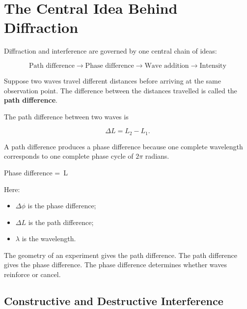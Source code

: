 \documentclass{studentnotes}
\begin{document}
\makenotetitle%

\tableofcontents
\newpage

\section{The Central Idea Behind Diffraction}

Diffraction and interference are governed by one central chain of ideas:

\[
    \boxed{
        \text{Path difference}
        \longrightarrow
        \text{Phase difference}
        \longrightarrow
        \text{Wave addition}
        \longrightarrow
        \text{Intensity}
    }
\]

Suppose two waves travel different distances before arriving at the same observation point. The difference between the distances travelled is called the \textbf{path difference}.

\begin{definition}
    The path difference between two waves is

    \[
        \Delta L=L_2-L_1.
    \]
\end{definition}

A path difference produces a phase difference because one complete wavelength corresponds to one complete phase cycle of \(2\pi\) radians.

\begin{namedformula}{Phase difference}
    \Delta\phi%
    =
    \frac{2\pi}{\lambda}\Delta\,L
\end{namedformula}

Here:

\begin{itemize}
    \item \(\Delta\phi\) is the phase difference;
    \item \(\Delta L\) is the path difference;
    \item \(\lambda\) is the wavelength.
\end{itemize}

\begin{importantnote}
    The geometry of an experiment gives the path difference. The path difference gives the phase difference. The phase difference determines whether waves reinforce or cancel.
\end{importantnote}

\subsection{Constructive and Destructive Interference}
\end{document}
